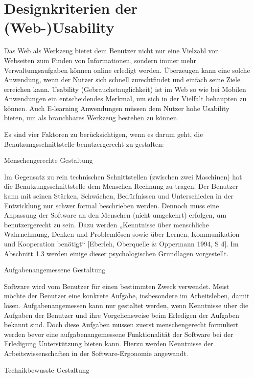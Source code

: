 \documentclass[a4paper, 12pt, twoside, BCOR=20mm, DIV=calc, abstracton, parskip=half*, toc=bibliography, toc=listof, headsepline, footsepline, headings=small, numbers=enddot]{scrreprt}
\begin{document}
		
		
	
		
		
		\section{Designkriterien der (Web-)Usability}
	Das Web als Werkzeug bietet dem Benutzer nicht nur eine Vielzahl von Webseiten zum Finden von Informationen, sondern immer mehr Verwaltungsaufgaben können online erledigt werden. Überzeugen kann eine solche Anwendung, wenn der Nutzer sich schnell zurechtfindet und einfach seine Ziele erreichen kann. Usability (Gebrauchstauglichkeit) ist im Web so wie bei Mobilen Anwendungen ein entscheidendes Merkmal, um sich in der Vielfalt behaupten zu können. Auch E-learning Anwendungen müssen dem Nutzer hohe Usability bieten, um als brauchbares Werkzeug bestehen zu können.\newline
				
	
		Es sind vier Faktoren zu berücksichtigen, wenn es darum geht, die Benutzungsschnittstelle benutzergerecht zu gestalten:
		
		Menschengerechte Gestaltung
		
		Im Gegensatz zu rein technischen Schnittstellen (zwischen zwei Maschinen) hat die Benutzungsschnittstelle dem Menschen Rechnung zu tragen. Der Benutzer kann mit seinen Stärken, Schwächen, Bedürfnissen und Unterschieden in der Entwicklung nur schwer formal beschrieben werden. Dennoch muss eine Anpassung der Software an den Menschen (nicht umgekehrt) erfolgen, um benutzergerecht zu sein. Dazu werden „Kenntnisse über menschliche Wahrnehmung, Denken und Problemlösen sowie über Lernen, Kommunikation und Kooperation benötigt“ [Eberleh, Oberquelle \& Oppermann 1994, S 4]. Im Abschnitt 1.3 werden einige dieser psychologischen Grundlagen vorgestellt.
		
		Aufgabenangemessene Gestaltung
		
		Software wird vom Benutzer für einen bestimmten Zweck verwendet. Meist möchte der Benutzer eine konkrete Aufgabe, insbesondere im Arbeitsleben, damit lösen. Aufgabenangemessen kann nur gestaltet werden, wenn Kenntnisse über die Aufgaben der Benutzer und ihre Vorgehensweise beim Erledigen der Aufgaben bekannt sind. Doch diese Aufgaben müssen zuerst menschengerecht formuliert werden bevor eine aufgabenangemessene Funktionalität der Software bei der Erledigung Unterstützung bieten kann. Hierzu werden Kenntnisse der Arbeitswissenschaften in der Software-Ergonomie angewandt.
		
		Technikbewusste Gestaltung
		
\end{document}
